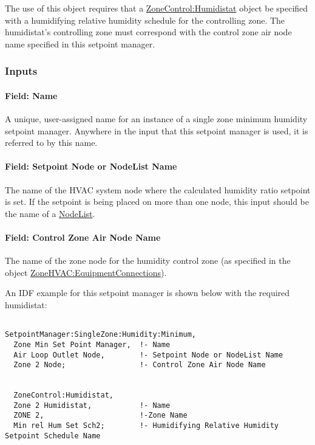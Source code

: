 The use of this object requires that a \hyperref[zonecontrolhumidistat]{ZoneControl:Humidistat} object be specified with a humidifying relative humidity schedule for the controlling zone. The humidistat's controlling zone must correspond with the control zone air node name specified in this setpoint manager.

\subsubsection{Inputs}\label{inputs-6-024}

\paragraph{Field: Name}\label{field-name-6-020}

A unique, user-assigned name for an instance of a single zone minimum humidity setpoint manager. Anywhere in the input that this setpoint manager is used, it is referred to by this name.

\paragraph{Field: Setpoint Node or NodeList Name}\label{field-setpoint-node-or-nodelist-name-6}

The name of the HVAC system node where the calculated humidity ratio setpoint is set. If the setpoint is being placed on more than one node, this input should be the name of a \hyperref[nodelist]{NodeList}.

\paragraph{Field: Control Zone Air Node Name}\label{field-control-zone-air-node-name}

The name of the zone node for the humidity control zone (as specified in the object \hyperref[zonehvacequipmentconnections]{ZoneHVAC:EquipmentConnections}).

An IDF example for this setpoint manager is shown below with the required humidistat:

\begin{lstlisting}

SetpointManager:SingleZone:Humidity:Minimum,
  Zone Min Set Point Manager,  !- Name
  Air Loop Outlet Node,        !- Setpoint Node or NodeList Name
  Zone 2 Node;                 !- Control Zone Air Node Name


  ZoneControl:Humidistat,
  Zone 2 Humidistat,           !- Name
  ZONE 2,                      !-Zone Name
  Min rel Hum Set Sch2;        !- Humidifying Relative Humidity Setpoint Schedule Name
\end{lstlisting}

